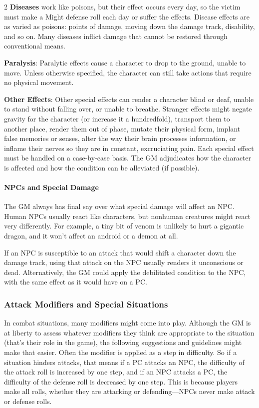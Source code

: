 \begin{multicols}{2}
\textbf{Diseases} work like poisons, but their effect occurs every day, so the victim must make a Might defense roll each day or suffer the effects. Disease effects are as varied as poisons: points of damage, moving down the damage track, disability, and so on. Many diseases inflict damage that cannot be restored through conventional means.

\textbf{Paralysis}: Paralytic effects cause a character to drop to the ground, unable to move. Unless otherwise specified, the character can still take actions that require no physical movement.

\textbf{Other Effects}: Other special effects can render a character blind or deaf, unable to stand without falling over, or unable to breathe. Stranger effects might negate gravity for the character (or increase it a hundredfold), transport them to another place, render them out of phase, mutate their physical form, implant false memories or senses, alter the way their brain processes information, or inflame their nerves so they are in constant, excruciating pain. Each special effect must be handled on a case-by-case basis. The GM adjudicates how the character is affected and how the condition can be alleviated (if possible).

\paragraph{NPCs and Special Damage}

The GM always has final say over what special damage will affect an NPC. Human NPCs usually react like characters, but nonhuman creatures might react very differently. For example, a tiny bit of venom is unlikely to hurt a gigantic dragon, and it won’t affect an android or a demon at all.

If an NPC is susceptible to an attack that would shift a character down the damage track, using that attack on the NPC usually renders it unconscious or dead. Alternatively, the GM could apply the debilitated condition to the NPC, with the same effect as it would have on a PC.

\subsubsection{Attack Modifiers and Special Situations}

In combat situations, many modifiers might come into play. Although the GM is at liberty to assess whatever modifiers they think are appropriate to the situation (that’s their role in the game), the following suggestions and guidelines might make that easier. Often the modifier is applied as a step in difficulty. So if a situation hinders attacks, that means if a PC attacks an NPC, the difficulty of the attack roll is increased by one step, and if an NPC attacks a PC, the difficulty of the defense roll is decreased by one step. This is because players make all rolls, whether they are attacking or defending—NPCs never make attack or defense rolls.


\end{multicols}
